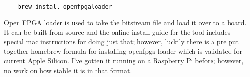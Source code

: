 

\begin{verbatim}
    brew install openfpgaloader
\end{verbatim}
Open FPGA loader is used to take the bitstream file and load it over to a board. 
It can be built from source and the online install guide for the tool includes special mac instructions for doing just that; however, 
luckily there is a pre put together homebrew formula for installing openfpga loader which is validated for current Apple Silicon. 
I've gotten it running on a Raspberry Pi before; however, no work on how stable it is in that format.